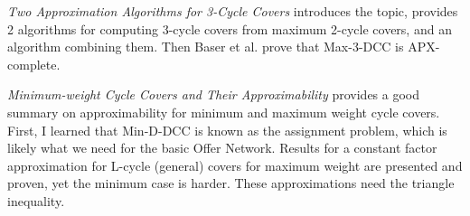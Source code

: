 \documentclass[
11pt, %
a4paper, %
oneside, %
headinclude,footinclude, %
BCOR5mm, %
]{scrartcl}
\title{\normalfont\spacedallcaps{Literature Summaries}} %
\author{\spacedlowsmallcaps{Zar Goertzel}} %
\date{\today} %
\begin{document}

\renewcommand{\sectionmark}[1]{\markright{\spacedlowsmallcaps{#1}}} %
\lehead{\mbox{\llap{\small\thepage\kern1em\color{halfgray} \vline}\color{halfgray}\hspace{0.5em}\rightmark\hfil}} %

\pagestyle{scrheadings} %


\maketitle %

\setcounter{tocdepth}{2} %





{\let\thefootnote\relax{}}


\textit{Two Approximation Algorithms for 3-Cycle Covers} \cite{Bla1} introduces the topic, provides 2 algorithms for computing 3-cycle covers from maximum 2-cycle covers, and an algorithm combining them. Then Baser et al. prove that Max-3-DCC is APX-complete.

\textit{Minimum-weight Cycle Covers and Their Approximability} \cite{Man1} provides a good summary on approximability for minimum and maximum weight cycle covers. First, I learned that Min-D-DCC is known as the assignment problem, which is likely what we need for the basic Offer Network. Results for a constant factor approximation for L-cycle (general) covers for maximum weight are presented and proven, yet the minimum case is harder. These approximations need the triangle inequality.
\end{document}
